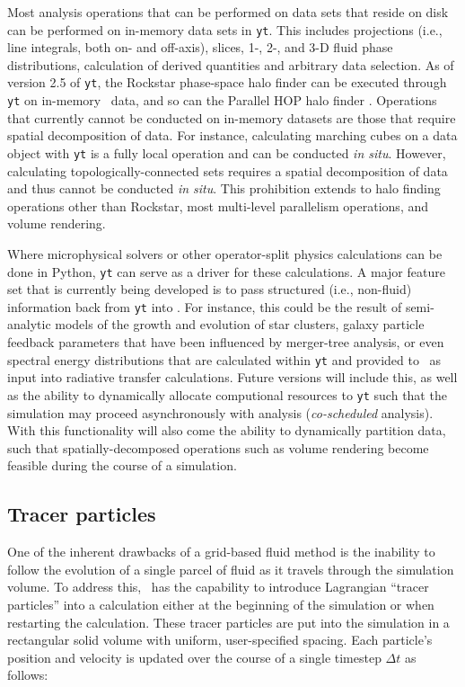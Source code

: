 Most analysis operations that can be performed on data sets that
reside on disk can be performed on in-memory data sets in \texttt{yt}.
This includes projections (i.e., line integrals, both on- and
off-axis), slices, 1-, 2-, and 3-D fluid phase distributions,
calculation of derived quantities and arbitrary data selection.  As of
version 2.5 of \texttt{yt}, the Rockstar phase-space halo finder
\citep{2013ApJ...762..109B} can be executed through \texttt{yt} on
in-memory \enzo\ data, and so can the Parallel HOP halo finder
\citep{1998ApJ...498..137E, 2010ApJS..191...43S}.  Operations that
currently cannot be conducted on in-memory datasets are those that
require spatial decomposition of data.  For instance, calculating
marching cubes on a data object with \texttt{yt} is a fully local
operation and can be conducted \textit{in situ}.  However, calculating
topologically-connected sets requires a spatial decomposition of data
and thus cannot be conducted \textit{in situ}.  This prohibition
extends to halo finding operations other than Rockstar, most
multi-level parallelism operations, and volume rendering.

Where microphysical solvers or other operator-split physics
calculations can be done in Python, \texttt{yt} can serve as a driver
for these calculations.  A major feature set that is currently being
developed is to pass structured (i.e., non-fluid) information back
from \texttt{yt} into \enzo.  For instance, this could be the result
of semi-analytic models of the growth and evolution of star clusters,
galaxy particle feedback parameters that have been influenced by
merger-tree analysis, or even spectral energy distributions that are
calculated within \texttt{yt} and provided to \enzo\ as input into
radiative transfer calculations.  Future versions will include this,
as well as the ability to dynamically allocate computional resources
to \texttt{yt} such that the simulation may proceed asynchronously
with analysis (\textit{co-scheduled} analysis).  With this
functionality will also come the ability to dynamically partition
data, such that spatially-decomposed operations such as volume
rendering become feasible during the course of a simulation.

\subsection{Tracer particles}

One of the inherent drawbacks of a grid-based fluid method is the
inability to follow the evolution of a single parcel of fluid as it
travels through the simulation volume.  To address this, \enzo\ has
the capability to introduce Lagrangian ``tracer particles'' into a
calculation either at the beginning of the simulation or when
restarting the calculation.  These tracer particles are put into the
simulation in a rectangular solid volume with uniform, user-specified
spacing.  Each particle's position and velocity is updated over the
course of a single timestep $\Delta t$ as follows:

